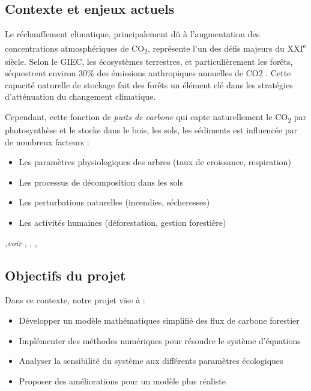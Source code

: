 \documentclass[12pt]{article}
\theoremstyle{saav}
\begin{document}
	\subsection{Contexte et enjeux actuels}
	Le réchauffement climatique, principalement dû à l'augmentation des concentrations atmosphériques de CO\textsubscript{2}, représente l'un des défis majeurs du XXI\textsuperscript{e} siècle. Selon le GIEC, les écosystèmes terrestres, et particulièrement les forêts, séquestrent environ 30\% des émissions anthropiques annuelles de CO2 \cite{friedlingstein2006climate}. 
	Cette capacité naturelle de stockage fait des forêts un élément clé dans les stratégies d'atténuation du changement climatique.
	
	Cependant, cette fonction de \og \emph{puits de carbone} \fg \hspace{1mm} qui capte naturellement le CO\textsubscript{2} par photosynthèse et le stocke dans le bois, les sols, les sédiments est influencée par de nombreux facteurs :
	\begin{itemize}[label*=\textbullet]
		\item Les paramètres physiologiques des arbres (taux de croissance, respiration)
		\item Les processus de décomposition dans les sols
		\item Les perturbations naturelles (incendies, sécheresses)
		\item Les activités humaines (déforestation, gestion forestière)
	\end{itemize}
	
	\textit{,voir} \cite{jenkinson1977turnover}, \cite{manzoni2009soil}, \cite{into1988division}, \cite{sitch2003evaluation}
	
	\subsection{Objectifs du projet}
	Dans ce contexte, notre projet vise à :
	\begin{itemize}[label*=\textbullet]
		\item Développer un modèle mathématiques simplifié des flux de carbone forestier
		\item Implémenter des méthodes numériques pour résoudre le système d'équations
		\item Analyser la sensibilité du système aux différents paramètres écologiques
		\item Proposer des améliorations pour un modèle plus réaliste
	\end{itemize}
	
\end{document}
